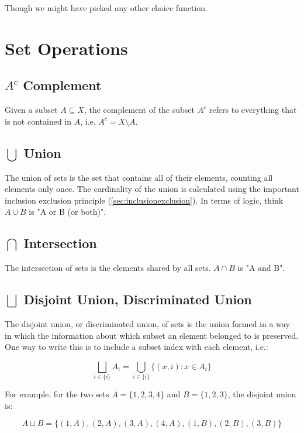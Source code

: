 Though we might have picked any other choice function.  


\section{Set Operations}

\subsection{$A^c$ Complement}
Given a subset $A \subseteq X$, the complement of the subset $A^c$ refers to everything that is not contained in $A$, i.e. $A^c = X\setminus A$. 


\subsection{$\bigcup$ Union}
The union of sets is the set that contains all of their elements, counting all elements only once. The cardinality of the union is calculated using the important inclusion exclusion principle (\ref{sec:inclusionexclusion}). In terms of logic, think $A\cup B$ is "A or B (or both)".

\subsection{$\bigcap$ Intersection}
The intersection of sets is the elements shared by all sets. $A\cap B$ is "A and B".

\subsection{$\bigsqcup$ Disjoint Union, Discriminated Union}
The disjoint union, or discriminated union, of sets is the union formed in a way in which the information about which subset an element belonged to is preserved. One way to write this is to include a subset index with each element, i.e.:

\begin{equation}
\bigsqcup_{i\in\{i\}}A_i = \bigcup_{i\in\{i\}} \{(x,i): x\in A_i\}
\end{equation}

For example, for the two sets $A=\{1,2,3,4\}$ and $B=\{1,2,3\}$, the disjoint union is:

\begin{equation}
A\sqcup B = \{(1,A),(2,A),(3,A),(4,A),(1,B),(2,B),(3,B)\}
\end{equation}

